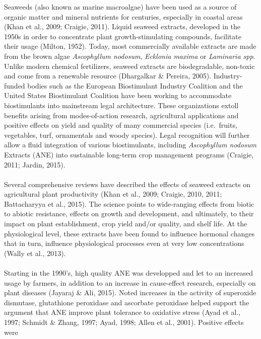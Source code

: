 \documentclass[12pt,]{article}
\begin{document}
Seaweeds (also known as marine macroalgae) have been used as a source of
organic matter and mineral nutrients for centuries, especially in
coastal areas (Khan et al., 2009; Craigie, 2011). Liquid seaweed
extracts, developed in the 1950s in order to concentrate plant
growth-stimulating compounds, facilitate their usage (Milton, 1952).
Today, most commercially available extracts are made from the brown
algae \emph{Ascophyllum nodosum}, \emph{Ecklonia maxima} or
\emph{Laminaria spp}. Unlike modern chemical fertilizers, seaweed
extracts are biodegradable, non-toxic and come from a renewable resource
(Dhargalkar \& Pereira, 2005). Industry-funded bodies such as the
European Biostimulant Industry Coalition and the United States
Biostimulant Coalition have been working to accommodate biostimulants
into mainstream legal architecture. These organizations extoll benefits
arising from modes-of-action research, agricultural applications and
positive effects on yield and quality of many commercial species
(i.e.~fruits, vegetables, turf, ornamentals and woody species). Legal
recognition will further allow a fluid integration of various
biostimulants, including \emph{Ascophyllum nodosum} Extracts (ANE) into
sustainable long-term crop management programs (Craigie, 2011; Jardin,
2015).\\
\hspace*{0.333em}\\
Several comprehensive reviews have described the effects of seaweed
extracts on agricultural plant productivity (Khan et al., 2009; Craigie,
2010, 2011; Battacharyya et al., 2015). The science points to
wide-ranging effects from biotic to abiotic resistance, effects on
growth and development, and ultimately, to their impact on plant
establishment, crop yield and/or quality, and shelf life. At the
physiological level, these extracts have been found to influence
hormonal changes that in turn, influence physiological processes even at
very low concentrations (Wally et al., 2013).\\
\hspace*{0.333em}\\
Starting in the 1990's, high quality ANE was developped and let to an
increased usage by farmers, in addition to an increase in cause-effect
research, especially on plant diseases (Jayaraj \& Ali, 2015). Noted
increases in the activity of superoxide dismutase, glutathione
peroxidase and ascorbate peroxidase helped support the argument that ANE
improve plant tolerance to oxidative stress (Ayad et al., 1997; Schmidt
\& Zhang, 1997; Ayad, 1998; Allen et al., 2001). Positive effects were
\end{document}
